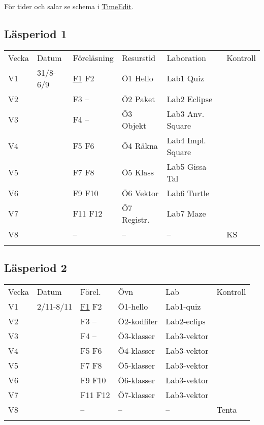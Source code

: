 För tider och salar se schema i
\href{http://cs.lth.se/eda016/schema}{TimeEdit}.

\subsection{Läsperiod 1}\label{lasperiod-1}

\begin{longtable}[c]{@{}llllll@{}}
\toprule\addlinespace
Vecka & Datum & Föreläsning & Resurstid & Laboration & Kontroll
\\\addlinespace
\midrule\endhead
V1 & 31/8-6/9 &
\href{http://fileadmin.cs.lth.se/cs/Education/EDA016/lectures/f1.pdf}{F1}
F2 & Ö1 Hello & Lab1 Quiz &
\\\addlinespace
V2 & & F3 -- & Ö2 Paket & Lab2 Eclipse &
\\\addlinespace
V3 & & F4 -- & Ö3 Objekt & Lab3 Anv. Square &
\\\addlinespace
V4 & & F5 F6 & Ö4 Räkna & Lab4 Impl. Square &
\\\addlinespace
V5 & & F7 F8 & Ö5 Klass & Lab5 Gissa Tal &
\\\addlinespace
V6 & & F9 F10 & Ö6 Vektor & Lab6 Turtle &
\\\addlinespace
V7 & & F11 F12 & Ö7 Registr. & Lab7 Maze &
\\\addlinespace
V8 & & -- & -- & -- & KS
\\\addlinespace
\bottomrule
\end{longtable}

\subsection{Läsperiod 2}\label{lasperiod-2}

\begin{longtable}[c]{@{}llllll@{}}
\toprule\addlinespace
Vecka & Datum & Förel. & Övn & Lab & Kontroll
\\\addlinespace
\midrule\endhead
V1 & 2/11-8/11 &
\href{http://fileadmin.cs.lth.se/cs/Education/EDA016/lectures/f1.pdf}{F1}
F2 & Ö1-hello & Lab1-quiz &
\\\addlinespace
V2 & & F3 -- & Ö2-kodfiler & Lab2-eclips &
\\\addlinespace
V3 & & F4 -- & Ö3-klasser & Lab3-vektor &
\\\addlinespace
V4 & & F5 F6 & Ö4-klasser & Lab3-vektor &
\\\addlinespace
V5 & & F7 F8 & Ö5-klasser & Lab3-vektor &
\\\addlinespace
V6 & & F9 F10 & Ö6-klasser & Lab3-vektor &
\\\addlinespace
V7 & & F11 F12 & Ö7-klasser & Lab3-vektor &
\\\addlinespace
V8 & & -- & -- & -- & Tenta
\\\addlinespace
\bottomrule
\end{longtable}
